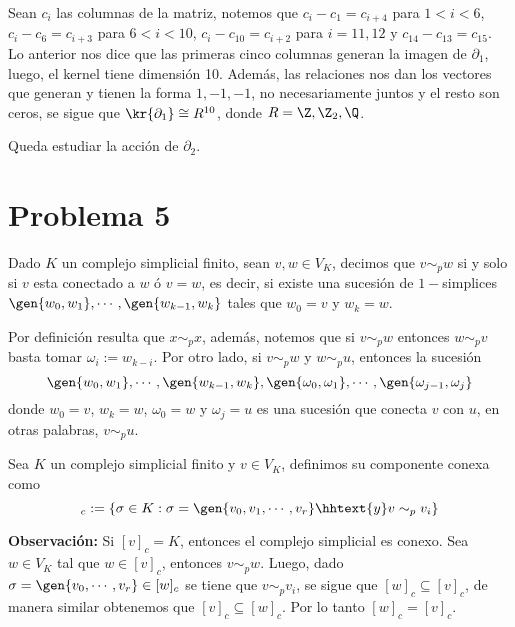 \documentclass{article}
\begin{document}
\begin{enumerate}
    \vspace{1mm}
    Sean $c_{i}$ las columnas de la matriz, notemos que $c_{i}-c_{1}=c_{i+4}$ para $1<i<6$, 
    $c_{i}-c_{6}=c_{i+3}$ para $6<i<10$, $c_{i}-c_{10}=c_{i+2}$ para $i=11,12$ y 
    $c_{14}-c_{13}=c_{15}$. Lo anterior nos dice que las primeras cinco columnas generan la imagen
    de $\partial_{1}$, luego, el kernel tiene dimensión 10. Además, las relaciones nos dan los 
    vectores que generan y tienen la forma $1,-1,-1$, no necesariamente juntos y el resto son 
    ceros, se sigue que $\kr{\partial_{1}}\cong R^{10}$, donde $R=\Z,\Z_{2},\Q$.

    \vspace{1mm}
    Queda estudiar la acción de $\partial_{2}$.
\end{enumerate}

\section*{Problema 5}
\noindent Dado $K$ un complejo simplicial finito, sean $v,w\in V_{K}$, decimos que $v\sim_{p}w$ si
y solo si $v$ esta conectado a $w$ ó $v=w$, es decir, si existe una sucesión de $1-$simplices
$\gen{w_{0},w_{1}},\cdots,\gen{w_{k-1},w_{k}}$ tales que $w_{0}=v$ y $w_{k}=w$. 

\vspace{1mm}
\noindent Por definición resulta que $x\sim_{p}x$, además, notemos que si $v\sim_{p}w$ entonces 
$w\sim_{p}v$ basta tomar $\omega_{i}:=w_{k-i}$. Por otro lado, si $v\sim_{p}w$ y $w\sim_{p}u$, 
entonces la sucesión
\begin{equation*}
    \gen{w_{0},w_{1}},\cdots,\gen{w_{k-1},w_{k}},\gen{\omega_{0},\omega_{1}},\cdots,
    \gen{\omega_{j-1},\omega_{j}}
\end{equation*}
donde $w_{0}=v$, $w_{k}=w$, $\omega_{0}=w$ y $\omega_{j}=u$ es una sucesión que conecta $v$ con 
$u$, en otras palabras, $v\sim_{p}u$.

\vspace{2mm}
\begin{dfn}
    Sea $K$ un complejo simplicial finito y $v\in V_{K}$, definimos su componente conexa
    como
    \begin{equation*}
        [v]_{c}:=\{\sigma\in K:\sigma=\gen{v_{0},v_{1},\cdots,v_{r}}\hhtext{y}v\sim_{p}v_{i}\}
    \end{equation*}
\end{dfn}

\noindent\textbf{Observación:} Si $[v]_{c}=K$, entonces el complejo simplicial es conexo. Sea 
$w\in V_{K}$ tal que $w\in[v]_{c}$, entonces $v\sim_{p}w$. Luego, dado $\sigma
=\gen{v_{0},\cdots,v_{r}}\in[w]_{c}$ se tiene que $v\sim_{p}v_{i}$, se sigue que 
$[w]_{c}\subseteq[v]_{c}$, de manera similar obtenemos que $[v]_{c}\subseteq[w]_{c}$. Por lo tanto
$[w]_{c}=[v]_{c}$.
\end{document}
